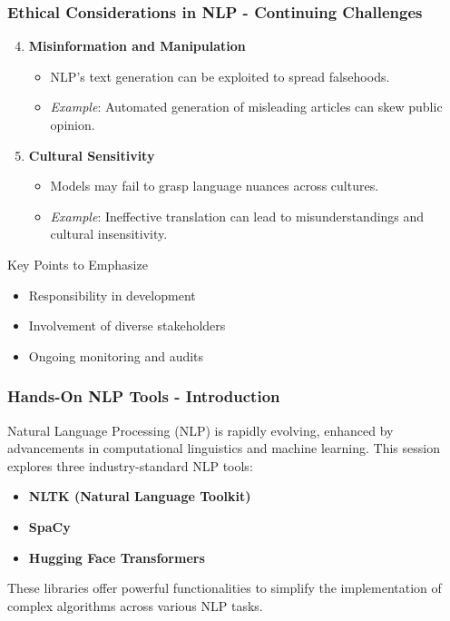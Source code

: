\documentclass[aspectratio=169]{beamer}
\begin{document}
\begin{frame}[fragile]
    \frametitle{Ethical Considerations in NLP - Continuing Challenges}
    \begin{enumerate}
        \setcounter{enumi}{3}
        \item \textbf{Misinformation and Manipulation}
        \begin{itemize}
            \item NLP's text generation can be exploited to spread falsehoods.
            \item \textit{Example}: Automated generation of misleading articles can skew public opinion.
        \end{itemize}

        \item \textbf{Cultural Sensitivity}
        \begin{itemize}
            \item Models may fail to grasp language nuances across cultures.
            \item \textit{Example}: Ineffective translation can lead to misunderstandings and cultural insensitivity.
        \end{itemize}
    \end{enumerate}

    \begin{block}{Key Points to Emphasize}
        \begin{itemize}
            \item Responsibility in development
            \item Involvement of diverse stakeholders
            \item Ongoing monitoring and audits
        \end{itemize}
    \end{block}
\end{frame}

\begin{frame}[fragile]
    \frametitle{Hands-On NLP Tools - Introduction}
    Natural Language Processing (NLP) is rapidly evolving, enhanced by advancements in computational linguistics and machine learning. This session explores three industry-standard NLP tools:
    \begin{itemize}
        \item \textbf{NLTK (Natural Language Toolkit)}
        \item \textbf{SpaCy}
        \item \textbf{Hugging Face Transformers}
    \end{itemize}
    These libraries offer powerful functionalities to simplify the implementation of complex algorithms across various NLP tasks.
\end{frame}
\end{document}
